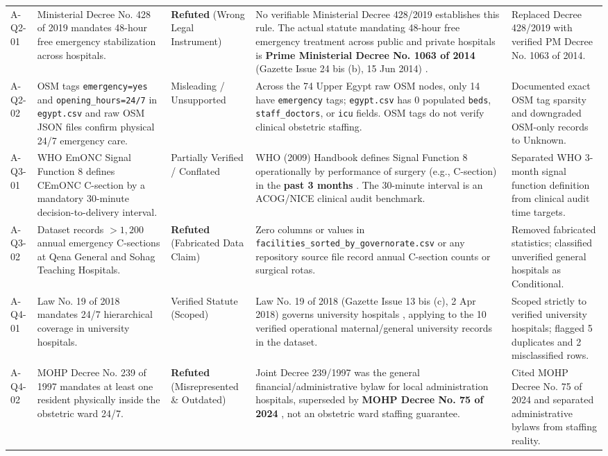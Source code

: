 \documentclass[10pt,a4paper]{article}
\begin{document}
{\begin{longtable}{p{1.1cm} p{3.8cm} p{2.3cm} p{5.2cm} p{3.4cm}}
A-Q2-01 & Ministerial Decree No. 428 of 2019 mandates 48-hour free emergency stabilization across hospitals. & \textcolor{accentred}{\textbf{Refuted}} (Wrong Legal Instrument) & No verifiable Ministerial Decree 428/2019 establishes this rule. The actual statute mandating 48-hour free emergency treatment across public and private hospitals is \textbf{Prime Ministerial Decree No. 1063 of 2014} (Gazette Issue 24 bis (b), 15 Jun 2014) \cite{egypt_pm_decree_1063_2014}. & Replaced Decree 428/2019 with verified PM Decree No. 1063 of 2014. \\[0.4em]
A-Q2-02 & OSM tags \texttt{emergency=yes} and \texttt{opening\_hours=24/7} in \texttt{egypt.csv} and raw OSM JSON files confirm physical 24/7 emergency care. & Misleading / Unsupported & Across the 74 Upper Egypt raw OSM nodes, only 14 have \texttt{emergency} tags; \texttt{egypt.csv} has 0 populated \texttt{beds}, \texttt{staff\_doctors}, or \texttt{icu} fields. OSM tags do not verify clinical obstetric staffing. & Documented exact OSM tag sparsity and downgraded OSM-only records to Unknown. \\[0.4em]
A-Q3-01 & WHO EmONC Signal Function 8 defines CEmONC C-section by a mandatory 30-minute decision-to-delivery interval. & Partially Verified / Conflated & WHO (2009) Handbook defines Signal Function 8 operationally by performance of surgery (e.g., C-section) in the \textbf{past 3 months} \cite{who2009emonc}. The 30-minute interval is an ACOG/NICE clinical audit benchmark. & Separated WHO 3-month signal function definition from clinical audit time targets. \\[0.4em]
A-Q3-02 & Dataset records $>1,200$ annual emergency C-sections at Qena General and Sohag Teaching Hospitals. & \textcolor{accentred}{\textbf{Refuted}} (Fabricated Data Claim) & Zero columns or values in \texttt{facilities\_sorted\_by\_governorate.csv} or any repository source file record annual C-section counts or surgical rotas. & Removed fabricated statistics; classified unverified general hospitals as Conditional. \\[0.4em]
A-Q4-01 & Law No. 19 of 2018 mandates 24/7 hierarchical coverage in university hospitals. & Verified Statute (Scoped) & Law No. 19 of 2018 (Gazette Issue 13 bis (c), 2 Apr 2018) governs university hospitals \cite{egypt_law_19_2018_univ}, applying to the 10 verified operational maternal/general university records in the dataset. & Scoped strictly to verified university hospitals; flagged 5 duplicates and 2 misclassified rows. \\[0.4em]
A-Q4-02 & MOHP Decree No. 239 of 1997 mandates at least one resident physically inside the obstetric ward 24/7. & \textcolor{accentred}{\textbf{Refuted}} (Misrepresented \& Outdated) & Joint Decree 239/1997 was the general financial/administrative bylaw for local administration hospitals, superseded by \textbf{MOHP Decree No. 75 of 2024} \cite{egypt_mohp_decree_75_2024}, not an obstetric ward staffing guarantee. & Cited MOHP Decree No. 75 of 2024 and separated administrative bylaws from staffing reality. \\[0.4em]

\end{longtable}}
\end{document}
